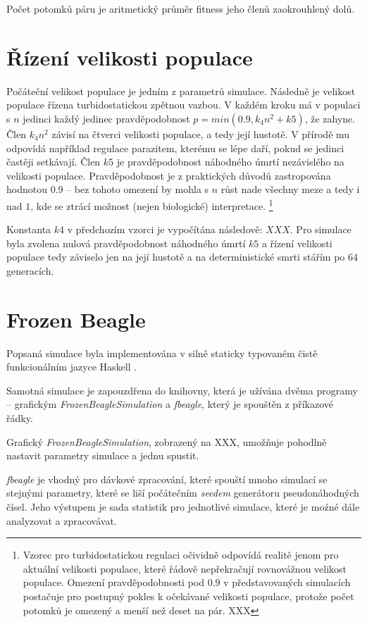 Počet potomků páru je aritmetický průměr fitness jeho členů zaokrouhlený dolů.


\section{Řízení velikosti populace}

Počáteční velikost populace je jedním z parametrů simulace. Následně je velikost populace řízena turbidostatickou zpětnou vazbou. V každém kroku má v populaci s $n$ jedinci každý jedinec pravděpodobnost $p = min(0.9, k_4 n^2 + k5)$, že zahyne. Člen $k_4 n^2$ závisí na čtverci velikosti populace, a tedy její hustotě. V přírodě mu odpovídá například regulace parazitem, kterému se lépe daří, pokud se jedinci častěji setkávají. Člen $k5$ je pravděpodobnost náhodného úmrtí nezávislého na velikosti populace. Pravděpodobnost je z praktických důvodů zastropována hodnotou 0.9 -- bez tohoto omezení by mohla s $n$ růst nade všechny meze a tedy i nad $1$, kde se ztrácí možnost (nejen biologické) interpretace.
\footnote{Vzorec pro turbidostatickou regulaci očividně odpovídá realitě jenom pro aktuální velikosti populace, které řádově nepřekračují rovnovážnou velikost populace. Omezení pravděpodobnosti pod $0.9$ v představovaných simulacích postačuje pro postupný pokles k očekávané velikosti populace, protože počet potomků je omezený a menší než deset na pár. XXX}

Konstanta $k4$ v předchozím vzorci je vypočítána následově: $XXX$. Pro simulace byla zvolena nulová pravděpodobnost náhodného úmrtí $k5$ a řízení velikosti populace tedy záviselo jen na její hustotě a na deterministické smrti stářím po $64$ generacích.


\section{Frozen Beagle}

Popsaná simulace byla implementována v silně staticky typovaném čistě funkcionálním jazyce Haskell \cite{Haskell}.

Samotná simulace je zapouzdřena do knihovny, která je užívána dvěma programy -- grafickým \textit{FrozenBeagleSimulation} a \textit{fbeagle}, který je spouštěn z příkazové řádky.

Grafický \textit{FrozenBeagleSimulation}, zobrazený na XXX, umožňuje pohodlně nastavit parametry simulace a jednu spustit.

\textit{fbeagle} je vhodný pro dávkové zpracování, které spouští mnoho simulací se stejnými parametry, které se liší počátečním \textit{seedem} generátoru pseudonáhodných čísel. Jeho výstupem je sada statistik pro jednotlivé simulace, které je moźné dále analyzovat a zpracovávat.


